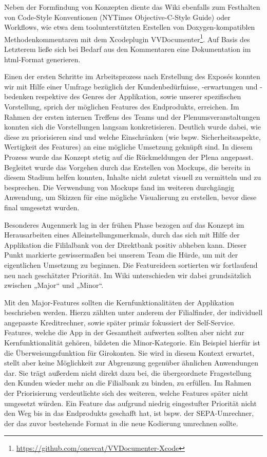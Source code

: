 	Neben der Formfindung von Konzepten diente das Wiki ebenfalls zum Festhalten von Code-Style Konventionen (NYTimes Objective-C-Style Guide) oder Workflows, wie etwa dem toolunterstützten Erstellen von Doxygen-kompatiblen Methodenkommentaren mit dem Xcodeplugin VVDocumenter\footnote{\url{https://github.com/onevcat/VVDocumenter-Xcode}}. Auf Basis des Letzterem ließe sich bei Bedarf aus den Kommentaren eine Dokumentation im html-Format generieren. 

	Einen der ersten Schritte im Arbeitsprozess nach Erstellung des Exposés konnten wir mit Hilfe einer Umfrage bezüglich der Kundenbedürfnisse, -erwartungen und -bedenken respektive des Genres der Applikation, sowie unserer spezifischen Vorstellung, sprich der möglichen Features des Endprodukts, erreichen. Im Rahmen der ersten internen Treffens des Teams und der Plenumsveranstaltungen konnten sich die Vorstellungen langsam konkretisieren. Deutlich wurde dabei, wie diese zu priorisieren sind und welche Einschränken (wie bspw. Sicherheitsaspekte, Wertigkeit des Features) an eine mögliche Umsetzung geknüpft sind. In diesem Prozess wurde das Konzept stetig auf die Rückmeldungen der Plena angepasst. Begleitet wurde das Vorgehen durch das Erstellen von Mockups, die bereits in diesem Stadium helfen konnten, Inhalte nicht zuletzt visuell zu vermitteln und zu besprechen. Die Verwendung von Mockups fand im weiteren durchgängig Anwendung, um Skizzen für eine mögliche Visualierung zu erstellen, bevor diese final umgesetzt wurden.

	Besonderes Augenmerk lag in der frühen Phase bezogen auf das Konzept im Herausarbeiten eines Alleinstellungsmerkmals, durch das sich mit Hilfe der Applikation die Fililalbank von der Direktbank positiv abheben kann. Dieser Punkt markierte gewissermaßen bei unserem Team die Hürde, um mit der eigentlichen Umsetzung zu beginnen. Die Featureideen sortierten wir fortlaufend neu nach geschätzter Priorität. Im Wiki unterschieden wir dabei grundsätzlich zwischen „Major“ und „Minor“.  
	
	Mit den Major-Features sollten die Kernfunktionalitäten der Applikation beschrieben werden. Hierzu zählten unter anderem der Filialfinder, der individuell angepasste Kreditrechner, sowie später primär fokussiert der Self-Service. Features, welche die App in der Gesamtheit aufwerten sollten aber nicht zur Kernfunktionalität gehören, bildeten die Minor-Kategorie. Ein Beispiel hierfür ist die Überweisungsfunktion für Girokonten. Sie wird in diesem Kontext erwartet, stellt aber keine Möglichkeit zur Abgrenzung gegenüber ähnlichen Anwendungen dar. Sie trägt außerdem nicht direkt dazu bei, die übergeordnete Fragestellung den Kunden wieder mehr an die Filialbank zu binden, zu erfüllen. Im Rahmen der Priorisierung verdeutlichte sich des weiteren, welche Features später nicht umgesetzt würden. Ein Feature das aufgrund niedrig eingestufter Priorität nicht den Weg bis in das Endprodukts geschafft hat, ist bspw. der SEPA-Umrechner, der das zuvor bestehende Format in die neue Kodierung umrechnen sollte. 
	
